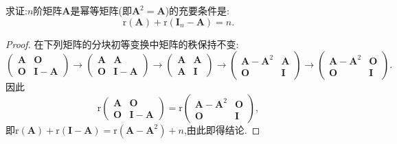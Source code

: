 \documentclass[lang=cn,newtx,10pt,scheme=chinese]{elegantbook}
\begin{document}
\begin{proposition}[幂等矩阵关于秩的判定准则]\label{proposition:幂等矩阵关于秩的判定准则}
求证:\(n\)阶矩阵\(\boldsymbol{A}\)是幂等矩阵(即\(\boldsymbol{A}^2 = \boldsymbol{A}\))的充要条件是:
\[
\mathrm{r}(\boldsymbol{A})+\mathrm{r}(\boldsymbol{I}_n - \boldsymbol{A}) = n.
\]
\end{proposition}
\begin{proof}
在下列矩阵的分块初等变换中矩阵的秩保持不变:
\[
\begin{pmatrix}
\boldsymbol{A}&\boldsymbol{O}\\
\boldsymbol{O}&\boldsymbol{I}-\boldsymbol{A}
\end{pmatrix}\to
\begin{pmatrix}
\boldsymbol{A}&\boldsymbol{A}\\
\boldsymbol{O}&\boldsymbol{I}-\boldsymbol{A}
\end{pmatrix}\to
\begin{pmatrix}
\boldsymbol{A}&\boldsymbol{A}\\
\boldsymbol{A}&\boldsymbol{I}
\end{pmatrix}\to
\begin{pmatrix}
\boldsymbol{A}-\boldsymbol{A}^2&\boldsymbol{A}\\
\boldsymbol{O}&\boldsymbol{I}
\end{pmatrix}\to
\begin{pmatrix}
\boldsymbol{A}-\boldsymbol{A}^2&\boldsymbol{O}\\
\boldsymbol{O}&\boldsymbol{I}
\end{pmatrix}.
\]
因此
\[
\mathrm{r}\begin{pmatrix}
\boldsymbol{A}&\boldsymbol{O}\\
\boldsymbol{O}&\boldsymbol{I}-\boldsymbol{A}
\end{pmatrix}=\mathrm{r}\begin{pmatrix}
\boldsymbol{A}-\boldsymbol{A}^2&\boldsymbol{O}\\
\boldsymbol{O}&\boldsymbol{I}
\end{pmatrix},
\]
即\(\mathrm{r}(\boldsymbol{A})+\mathrm{r}(\boldsymbol{I}-\boldsymbol{A})=\mathrm{r}(\boldsymbol{A}-\boldsymbol{A}^2)+n\),由此即得结论.  
\end{proof}
\end{document}
